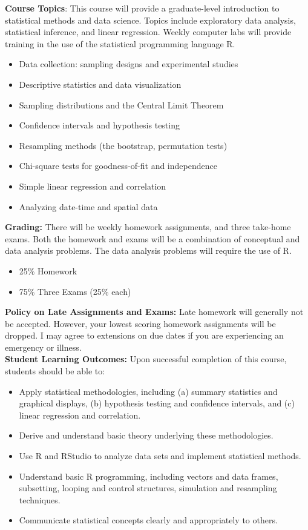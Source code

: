 \documentclass[12pt]{report}
\newenvironment{myitemize}
{ \begin{itemize}
    \setlength{\itemsep}{5pt}
    \setlength{\parskip}{0pt}
    \setlength{\parsep}{0pt}     }
{ \end{itemize}                  }
\begin{document}
\textbf{Course Topics}: This course will provide a graduate-level introduction to statistical methods and data science.  Topics include exploratory data analysis, statistical inference, and linear regression. Weekly computer labs will provide training in the use of the statistical programming language R.     
\begin{myitemize}
\item Data collection: sampling designs and experimental studies
\item Descriptive statistics and data visualization
\item Sampling distributions and the Central Limit Theorem
\item Confidence intervals and hypothesis testing 
\item Resampling methods (the bootstrap, permutation tests)
\item Chi-square tests for goodness-of-fit and independence
\item Simple linear regression and correlation
\item Analyzing date-time and spatial data\\
\end{myitemize} 

\textbf{Grading:}
There will be weekly homework assignments, and three take-home exams.  Both the homework and exams will be a combination of conceptual and data analysis problems.  The data analysis problems will require the use of R.  
\begin{myitemize}
\item 25\% Homework
\item 75\% Three Exams (25\% each)\\ 
\end{myitemize} 
  
\textbf{Policy on Late Assignments and Exams:}  Late homework will generally not be accepted.  However, your lowest scoring homework assignments will be dropped.  I may agree to extensions on due dates if you are experiencing an emergency or illness.\\

\textbf{Student Learning Outcomes:}  Upon successful completion of this course, students should be able to:
\begin{myitemize}
\item Apply statistical methodologies, including (a) summary statistics and graphical displays, (b) hypothesis testing and confidence intervals, and (c) linear regression and correlation.
\item Derive and understand basic theory underlying these methodologies. 
\item Use R and RStudio to analyze data sets and implement statistical methods.
\item Understand basic R programming, including vectors and data frames, subsetting, looping and control structures, simulation and resampling techniques. 
\item Communicate statistical concepts clearly and appropriately to others.\\ 
\end{myitemize}
\end{document}
